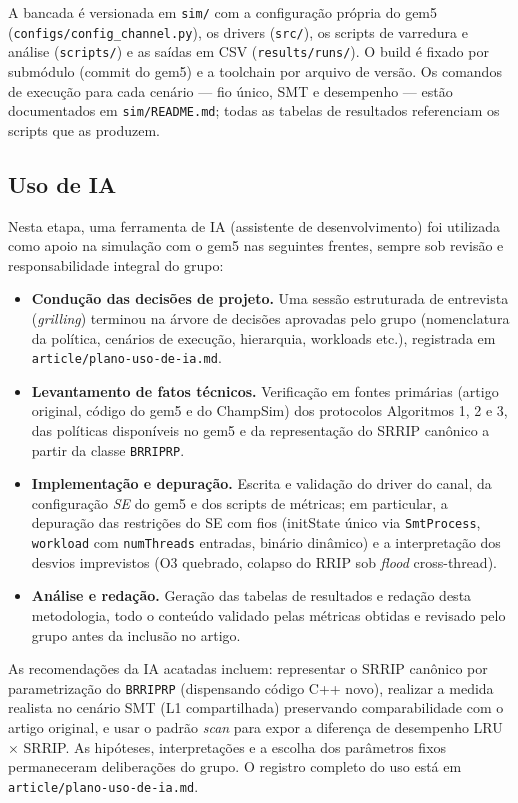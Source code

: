 A bancada é versionada em \texttt{sim/} com a configuração própria do gem5
(\texttt{configs/config\_channel.py}), os drivers (\texttt{src/}), os
scripts de varredura e análise (\texttt{scripts/}) e as saídas em CSV
(\texttt{results/runs/}). O build é fixado por submódulo (commit do gem5) e a
toolchain por arquivo de versão. Os comandos de execução para cada cenário ---
fio único, SMT e desempenho --- estão documentados em \texttt{sim/README.md};
todas as tabelas de resultados referenciam os scripts que as produzem.

\subsection{Uso de IA}

Nesta etapa, uma ferramenta de IA (assistente de desenvolvimento) foi
utilizada como apoio na simulação com o gem5 nas seguintes frentes, sempre
sob revisão e responsabilidade integral do grupo:

\begin{itemize}
    \item \textbf{Condução das decisões de projeto.} Uma sessão estruturada
          de entrevista (\textit{grilling}) terminou na árvore de decisões
          aprovadas pelo grupo (nomenclatura da política, cenários de
          execução, hierarquia, workloads etc.), registrada em
          \texttt{article/plano-uso-de-ia.md}.
    \item \textbf{Levantamento de fatos técnicos.} Verificação em fontes
          primárias (artigo original, código do gem5 e do ChampSim) dos
          protocolos Algoritmos 1, 2 e 3, das políticas disponíveis no gem5
          e da representação do SRRIP canônico a partir da classe
          \texttt{BRRIPRP}.
    \item \textbf{Implementação e depuração.} Escrita e validação do driver
          do canal, da configuração \textit{SE} do gem5 e dos scripts de
          métricas; em particular, a depuração das restrições do SE com
          fios (initState único via \texttt{SmtProcess},
          \texttt{workload} com \texttt{numThreads} entradas, binário
          dinâmico) e a interpretação dos desvios imprevistos (O3 quebrado,
          colapso do RRIP sob \textit{flood} cross-thread).
    \item \textbf{Análise e redação.} Geração das tabelas de resultados e
          redação desta metodologia, todo o conteúdo validado pelas métricas
          obtidas e revisado pelo grupo antes da inclusão no artigo.
\end{itemize}

As recomendações da IA acatadas incluem: representar o SRRIP canônico por
parametrização do \texttt{BRRIPRP} (dispensando código C++ novo), realizar a
medida realista no cenário SMT (L1 compartilhada) preservando
comparabilidade com o artigo original, e usar o padrão \textit{scan} para
expor a diferença de desempenho LRU $\times$ SRRIP. As hipóteses, interpretações e
a escolha dos parâmetros fixos permaneceram deliberações do grupo. O registro
completo do uso está em \texttt{article/plano-uso-de-ia.md}.
